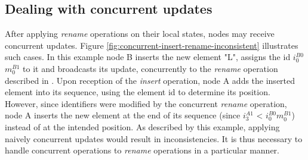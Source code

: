 \documentclass[10pt,journal,compsoc]{IEEEtran}
\newcommand{\trm}[1]{\mathit{#1}}
\newcommand{\id}[3]{$\trm{#1}^{\trm{#2}}_{\trm{#3}}$}
\begin{document}
\subsection{Dealing with concurrent updates}

\label{sec:dealing-with-concurrent-updates}

After applying \emph{rename} operations on their local states, nodes may receive concurrent updates.
Figure \ref{fig:concurrent-insert-rename-inconsistent} illustrates such cases.
In this example node B inserts the new element "L", assigns the id \id{i}{B0}{0}\id{m}{B1}{0} to it and broadcasts its update, concurrently to the \emph{rename} operation described in .
Upon reception of the \emph{insert} operation, node A adds the inserted element into its sequence, using the element id to determine its position.
However, since identifiers were modified by the concurrent \emph{rename} operation, node A inserts the new element at the end of its sequence (since \id{i}{A1}{3} < \id{i}{B0}{0}\id{m}{B1}{0}) instead of at the intended position.
As described by this example, applying naively concurrent updates would result in inconsistencies.
It is thus necessary to handle concurrent operations to \emph{rename} operations in a particular manner.
\end{document}
